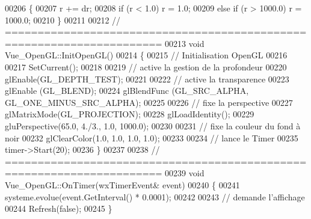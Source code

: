 \begin{DoxyCode}
00206 \{
00207   r += dr;
00208   \textcolor{keywordflow}{if} (r < 1.0) r = 1.0;
00209   \textcolor{keywordflow}{else} \textcolor{keywordflow}{if} (r > 1000.0) r = 1000.0;
00210 \}
00211 
00212 \textcolor{comment}{// ======================================================================}
00213 \textcolor{keywordtype}{void} Vue_OpenGL::InitOpenGL() 
00214 \{
00215   \textcolor{comment}{// Initialisation OpenGL}
00216 
00217   SetCurrent();
00218 
00219   \textcolor{comment}{// active la gestion de la profondeur}
00220   glEnable(GL\_DEPTH\_TEST);    
00221 
00222   \textcolor{comment}{// active la transparence}
00223   glEnable (GL\_BLEND);
00224   glBlendFunc (GL\_SRC\_ALPHA, GL\_ONE\_MINUS\_SRC\_ALPHA);
00225 
00226   \textcolor{comment}{// fixe la perspective}
00227   glMatrixMode(GL\_PROJECTION);
00228   glLoadIdentity();
00229   gluPerspective(65.0, 4./3., 1.0, 1000.0);
00230 
00231   \textcolor{comment}{// fixe la couleur du fond à noir}
00232   glClearColor(1.0, 1.0, 1.0, 1.0);
00233 
00234   \textcolor{comment}{// lance le Timer}
00235   timer->Start(20);
00236 \}
00237 
00238 \textcolor{comment}{// ======================================================================}
00239 \textcolor{keywordtype}{void} Vue_OpenGL::OnTimer(wxTimerEvent& event)
00240 \{
00241   systeme.evolue(event.GetInterval() * 0.0001);
00242 
00243   \textcolor{comment}{// demande l'affichage}
00244   Refresh(\textcolor{keyword}{false});
00245 \}
\end{DoxyCode}
